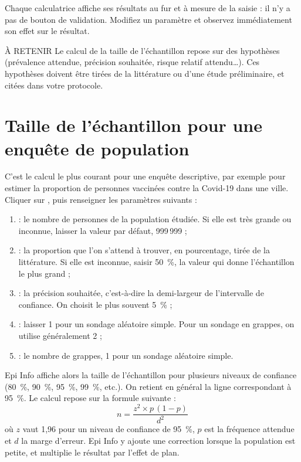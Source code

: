 Chaque calculatrice affiche ses résultats au fur et à mesure de la saisie : il n'y a pas de bouton de validation. Modifiez un paramètre et observez immédiatement son effet sur le résultat.

\begin{mybox}[colbacktitle=NOTE]{\faInfoCircle{} À RETENIR}
Le calcul de la taille de l'échantillon repose sur des hypothèses (prévalence attendue, précision souhaitée, risque relatif attendu\ldots). Ces hypothèses doivent être tirées de la littérature ou d'une étude préliminaire, et citées dans votre protocole.
\end{mybox}

\section[Taille de l'échantillon pour une enquête de population][Échantillon : enquête de population]{Taille de l'échantillon pour une enquête de population}
\label{statcalcPopulation}

C'est le calcul le plus courant pour une enquête descriptive, par exemple pour estimer la proportion de personnes vaccinées contre la Covid-19 dans une ville. Cliquer sur , puis renseigner les paramètres suivants :

\begin{enumerate}
	\item {} : le nombre de personnes de la population étudiée. Si elle est très grande ou inconnue, laisser la valeur par défaut, 999\,999 ;
	\item {} : la proportion que l'on s'attend à trouver, en pourcentage, tirée de la littérature. Si elle est inconnue, saisir 50~\%, la valeur qui donne l'échantillon le plus grand ;
	\item {} : la précision souhaitée, c'est-à-dire la demi-largeur de l'intervalle de confiance. On choisit le plus souvent 5~\% ;
	\item {} : laisser 1 pour un sondage aléatoire simple. Pour un sondage en grappes, on utilise généralement 2 ;
	\item {} : le nombre de grappes, 1 pour un sondage aléatoire simple.
\end{enumerate}

Epi Info affiche alors la taille de l'échantillon pour plusieurs niveaux de confiance (80~\%, 90~\%, 95~\%, 99~\%, etc.). On retient en général la ligne correspondant à 95~\%. Le calcul repose sur la formule suivante :
\[
n = \frac{z^2 \times p\,(1-p)}{d^2}
\]
où $z$ vaut 1,96 pour un niveau de confiance de 95~\%, $p$ est la fréquence attendue et $d$ la marge d'erreur. Epi Info y ajoute une correction lorsque la population est petite, et multiplie le résultat par l'effet de plan.

